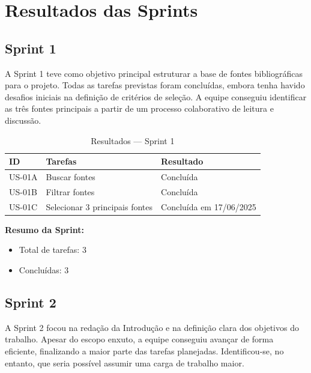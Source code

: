 \section{Resultados das Sprints}

\subsection{Sprint 1}

A Sprint 1 teve como objetivo principal estruturar a base de fontes bibliográficas para o projeto. Todas as tarefas previstas foram concluídas, embora tenha havido desafios iniciais na definição de critérios de seleção. A equipe conseguiu identificar as três fontes principais a partir de um processo colaborativo de leitura e discussão.

\begin{table}[htbp]
  \centering
  \caption{Resultados — Sprint 1}
  \label{tab:resultSprint1}
  \begin{tabular}{lll}
    \toprule
    ID & Tarefas & Resultado \\
    \midrule
    US-01A & Buscar fontes & Concluída \\
    US-01B & Filtrar fontes & Concluída \\
    US-01C & Selecionar 3 principais fontes & Concluída em 17/06/2025 \\
    \bottomrule
  \end{tabular}
\end{table}

\vspace{1em}
\noindent\textbf{Resumo da Sprint:}
\begin{itemize}[noitemsep]
  \item Total de tarefas: 3
  \item Concluídas: 3
\end{itemize}


\subsection{Sprint 2}

A Sprint 2 focou na redação da Introdução e na definição clara dos objetivos do trabalho. Apesar do escopo enxuto, a equipe conseguiu avançar de forma eficiente, finalizando a maior parte das tarefas planejadas. Identificou-se, no entanto, que seria possível assumir uma carga de trabalho maior.

